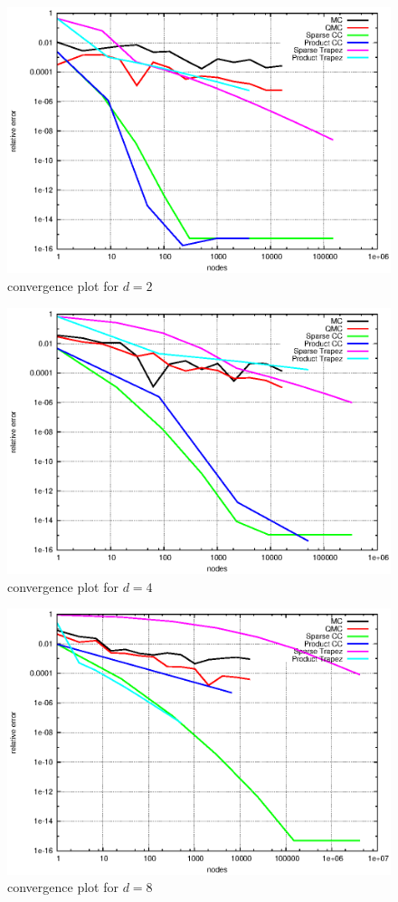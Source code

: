 \documentclass[]{article}
\begin{document}
\begin{figure}[!ht]
\includegraphics[width=.9\textwidth]{task13_d2}
\caption{convergence plot for $d=2$}
\label{fig:Task13b}
\end{figure}

\begin{figure}[!ht]
\includegraphics[width=.9\textwidth]{task13_d4}
\caption{convergence plot for $d=4$}
\label{fig:Task13c}
\end{figure}

\begin{figure}[!ht]
\includegraphics[width=.9\textwidth]{task13_d8}
\caption{convergence plot for $d=8$}
\label{fig:Task13d}
\end{figure}
\clearpage
\end{document}
